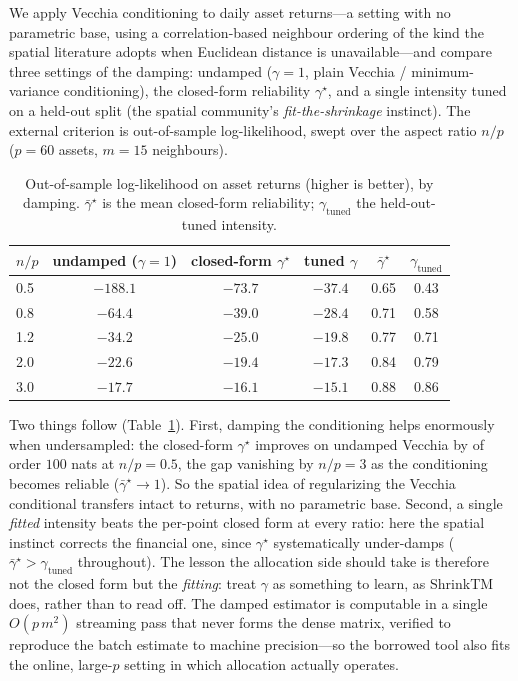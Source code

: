 \documentclass[11pt]{article}
\newcommand{\gstar}{\gamma^\star}
\begin{document}
We apply Vecchia conditioning to daily asset returns---a setting with no parametric base, using a
correlation-based neighbour ordering of the kind the spatial literature adopts when Euclidean distance
is unavailable---and compare three settings of the damping: undamped ($\gamma=1$, plain
Vecchia / minimum-variance conditioning), the closed-form reliability $\gstar$, and a single intensity
tuned on a held-out split (the spatial community's \emph{fit-the-shrinkage} instinct). The external
criterion is out-of-sample log-likelihood, swept over the aspect ratio $n/p$ ($p=60$ assets,
$m=15$ neighbours).

\begin{table}[h]\centering\small
\caption{Out-of-sample log-likelihood on asset returns (higher is better), by damping. $\bar\gstar$ is
the mean closed-form reliability; $\gamma_{\text{tuned}}$ the held-out-tuned intensity.}\label{tab:exp}
\begin{tabular}{lccccc}
\toprule
$n/p$ & undamped ($\gamma{=}1$) & closed-form $\gstar$ & tuned $\gamma$ & $\bar\gstar$ & $\gamma_{\text{tuned}}$\\
\midrule
0.5 & $-188.1$ & $-73.7$ & $\mathbf{-37.4}$ & 0.65 & 0.43\\
0.8 & $-64.4$  & $-39.0$ & $\mathbf{-28.4}$ & 0.71 & 0.58\\
1.2 & $-34.2$  & $-25.0$ & $\mathbf{-19.8}$ & 0.77 & 0.71\\
2.0 & $-22.6$  & $-19.4$ & $\mathbf{-17.3}$ & 0.84 & 0.79\\
3.0 & $-17.7$  & $-16.1$ & $\mathbf{-15.1}$ & 0.88 & 0.86\\
\bottomrule
\end{tabular}
\end{table}

Two things follow (Table~\ref{tab:exp}). First, damping the conditioning helps enormously when
undersampled: the closed-form $\gstar$ improves on undamped Vecchia by of order $100$ nats at
$n/p=0.5$, the gap vanishing by $n/p=3$ as the conditioning becomes reliable ($\bar\gstar\to1$). So the
spatial idea of regularizing the Vecchia conditional transfers intact to returns, with no parametric
base. Second, a single \emph{fitted} intensity beats the per-point closed form at every ratio: here
the spatial instinct corrects the financial one, since $\gstar$ systematically under-damps
($\bar\gstar>\gamma_{\text{tuned}}$ throughout). The lesson the allocation side should take is therefore
not the closed form but the \emph{fitting}: treat $\gamma$ as something to learn, as ShrinkTM does,
rather than to read off. The damped estimator is computable in a single $O(p\,m^2)$ streaming pass that
never forms the dense matrix, verified to reproduce the batch estimate to machine precision---so the
borrowed tool also fits the online, large-$p$ setting in which allocation actually operates.
\end{document}
